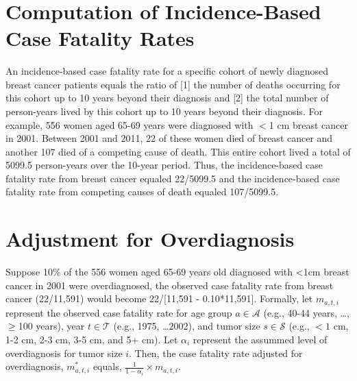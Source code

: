 \documentclass[11pt,letterpaper]{article}
\theoremstyle{plain}
\theoremstyle{remark}
\numberwithin{equation}{section}
\begin{document}
\blind \title{\bf \tit} \maketitle \fi


\thispagestyle{empty}
\setcounter{page}{0}



\newpage
\clearpage
 \setcounter{table}{0}  %
 \setcounter{figure}{0}  %
 \setcounter{page}{1}
 \renewcommand{\figurename}{Supplemental Figure}
 \renewcommand{\tablename}{Supplemental Table}
\appendix

\section{Computation of Incidence-Based Case Fatality Rates}
An incidence-based case fatality rate for a specific cohort of newly
diagnosed breast cancer patients equals the ratio of [1] the number of
deaths occurring for this cohort up to 10 years beyond their diagnosis
and [2] the total number of person-years lived by this cohort up to 10
years beyond their diagnosis.  For example, 556 women aged 65-69 years
were diagnosed with $<$1 cm breast cancer in 2001.  Between 2001 and
2011, 22 of these women died of breast cancer and another 107 died of
a competing cause of death.  This entire cohort lived a total of
5099.5 person-years over the 10-year period.  Thus, the
incidence-based case fatality rate from breast cancer equaled
22/5099.5 and the incidence-based case fatality rate from competing
causes of death equaled 107/5099.5.

\section{Adjustment for Overdiagnosis}
Suppose 10\% of the 556 women aged 65-69 years old diagnosed with <1cm
breast cancer in 2001 were overdiagnosed, the observed case fatality
rate from breast cancer (22/11,591) would become 22/[11,591 -
0.10*11,591].  Formally, let $m_{a,t,i}$ represent the observed case fatality
rate for age group $a \in \mathcal{A}$ (e.g., 40-44 years, \dots,
$\geq$100 years), year $t \in \mathcal{T}$ (e.g., 1975, \dots 2002), and
tumor size $s \in \mathcal{S}$ (e.g., $<1$
cm, 1-2 cm, 2-3 cm, 3-5 cm, and 5+ cm).  Let $\alpha_i$ represent the assummed
level of overdiagnosis for tumor size $i$. Then, the case fatality
rate adjusted for overdiagnosis, $m^*_{a,t,i}$ equals, $\frac{1}{1-\alpha_i} \times m_{a,t,i}$.
\end{document}
